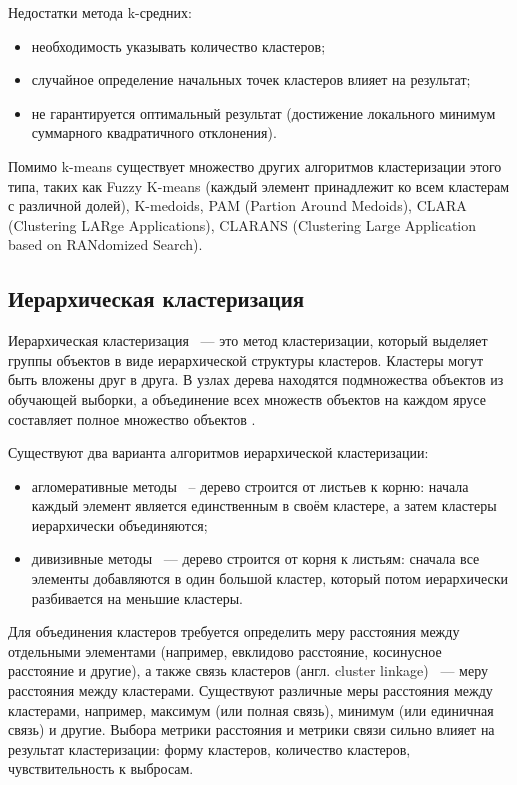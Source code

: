 Недостатки метода k-средних:
\begin{itemize}
    \item необходимость указывать количество кластеров;
    \item случайное определение начальных точек кластеров влияет на результат;
    \item не гарантируется оптимальный результат (достижение локального минимум суммарного квадратичного отклонения).
\end{itemize}

Помимо k-means существует множество других алгоритмов кластеризации этого типа, таких как Fuzzy K-means (каждый элемент принадлежит ко всем кластерам с различной долей), K-medoids, PAM (Partion Around Medoids), CLARA (Clustering LARge Applications), CLARANS (Clustering Large Application based on RANdomized Search).

\subsection{Иерархическая кластеризация}
Иерархическая кластеризация ~--- это метод кластеризации, который выделяет группы объектов в виде иерархической структуры кластеров. Кластеры могут быть вложены друг в друга. В узлах дерева находятся подмножества объектов из обучающей выборки, а объединение всех множеств объектов на каждом ярусе составляет полное множество объектов \cite{no-patterns, deep-clustering-survey}.

Существуют два варианта алгоритмов иерархической кластеризации:
\begin{itemize}
    \item агломеративные методы ~-- дерево строится от листьев к корню: начала каждый элемент является единственным в своём кластере, а затем кластеры иерархически объединяются;
    \item дивизивные методы ~--- дерево строится от корня к листьям: сначала все элементы добавляются в один большой кластер, который потом иерархически разбивается на меньшие кластеры.
\end{itemize}

Для объединения кластеров требуется определить меру расстояния между отдельными элементами (например, евклидово расстояние, косинусное расстояние и другие), а также связь кластеров (англ. cluster linkage) ~--- меру расстояния между кластерами. Существуют различные  меры расстояния между кластерами, например, максимум (или полная связь), минимум (или единичная связь) и другие. Выбора метрики расстояния и метрики связи сильно влияет на результат кластеризации: форму кластеров, количество кластеров, чувствительность к выбросам.

